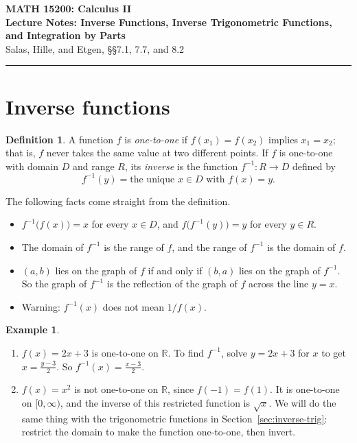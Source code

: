 \documentclass[12pt,letterpaper]{article}
\theoremstyle{definition}
\newtheorem{definition}[theorem]{Definition}
\newtheorem{example}[theorem]{Example}
\begin{document}
\begin{center}
  {\large\bfseries MATH 15200: Calculus II}\\
  {\large\bfseries Lecture Notes: Inverse Functions, Inverse Trigonometric
    Functions, and Integration by Parts}\\[0.3em]
  Salas, Hille, and Etgen, \S\S7.1, 7.7, and 8.2
\end{center}

\vspace{0.25em}
\hrule
\vspace{0.8em}

\section{Inverse functions}

\begin{definition}
  A function $f$ is \emph{one-to-one} if $f(x_1)=f(x_2)$ implies $x_1=x_2$;
  that is, $f$ never takes the same value at two different points. If $f$ is
  one-to-one with domain $D$ and range $R$, its \emph{inverse} is the function
  $f^{-1}\colon R\to D$ defined by
  \[
    f^{-1}(y)=\text{the unique $x\in D$ with $f(x)=y$}.
  \]
\end{definition}

The following facts come straight from the definition.
\begin{itemize}[itemsep=0.2em]
  \item $f^{-1}\bigl(f(x)\bigr)=x$ for every $x\in D$, and
    $f\bigl(f^{-1}(y)\bigr)=y$ for every $y\in R$.
  \item The domain of $f^{-1}$ is the range of $f$, and the range of $f^{-1}$
    is the domain of $f$.
  \item $(a,b)$ lies on the graph of $f$ if and only if $(b,a)$ lies on the
    graph of $f^{-1}$. So the graph of $f^{-1}$ is the reflection of the graph
    of $f$ across the line $y=x$.
  \item Warning: $f^{-1}(x)$ does not mean $1/f(x)$.
\end{itemize}

\begin{example}
  \begin{enumerate}[label=(\alph*)]
    \item $f(x)=2x+3$ is one-to-one on $\mathbb{R}$. To find $f^{-1}$, solve
      $y=2x+3$ for $x$ to get $x=\frac{y-3}{2}$. So
      $f^{-1}(x)=\frac{x-3}{2}$.
    \item $f(x)=x^2$ is not one-to-one on $\mathbb{R}$, since $f(-1)=f(1)$.
      It is one-to-one on $[0,\infty)$, and the inverse of this restricted
      function is $\sqrt{x}$. We will do the same thing with the
      trigonometric functions in Section~\ref{sec:inverse-trig}: restrict the
      domain to make the function one-to-one, then invert.
  \end{enumerate}
\end{example}
\end{document}
